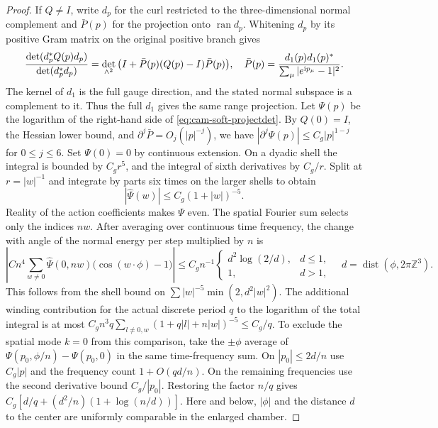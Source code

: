 \documentclass[11pt,a4paper]{article}
\numberwithin{equation}{section}
\begin{document}
\begin{proof}
If \(Q\ne I\), write \(d_p\) for the curl restricted to the three-dimensional normal complement and \(\bar P(p)\) for the projection onto \(\operatorname{ran}d_p\). Whitening \(d_p\) by its positive Gram matrix on the original positive branch gives
\begin{equation}
 \frac{\det(d_p^*Q(p)d_p)}{\det(d_p^*d_p)}
 =\det_{\wedge^2}\big(I+\bar P(p)(Q(p)-I)\bar P(p)\big),
 \quad
 \bar P(p)=\frac{d_1(p)d_1(p)^*}{\sum_\mu|e^{{\rm i}p_\mu}-1|^2}.
 \label{eq:cam-soft-projectdet}
\end{equation}
The kernel of \(d_1\) is the full gauge direction, and the stated normal subspace is a complement to it. Thus the full \(d_1\) gives the same range projection. Let \(\Psi(p)\) be the logarithm of the right-hand side of \eqref{eq:cam-soft-projectdet}. By \(Q(0)=I\), the Hessian lower bound, and \(\partial^j\bar P=O_j(|p|^{-j})\), we have \(|\partial^j\Psi(p)|\le C_g|p|^{1-j}\) for \(0\le j\le6\). Set \(\Psi(0)=0\) by continuous extension. On a dyadic shell the integral is bounded by \(C_g r^5\), and the integral of sixth derivatives by \(C_g/r\). Split at \(r=|w|^{-1}\) and integrate by parts six times on the larger shells to obtain
\begin{equation}
               |\widehat\Psi(w)|\le C_g(1+|w|)^{-5}.              \label{eq:cam-soft-projfourier}
\end{equation}
Reality of the action coefficients makes \(\Psi\) even. The spatial Fourier sum selects only the indices \(nw\). After averaging over continuous time frequency, the change with angle of the normal energy per step multiplied by \(n\) is
\[
 \left|C n^4\sum_{w\ne0}\widehat\Psi(0,nw)
                   \bigl(\cos(w\cdot\phi)-1\bigr)\right|
 \le C_g n^{-1}
 \begin{cases}d^2\log(2/d),&d\le1,\\1,&d>1,\end{cases}
 \quad d=\operatorname{dist}(\phi,2\pi\mathbb Z^3).
\]
This follows from the shell bound on \(\sum |w|^{-5}\min(2,d^2|w|^2)\). The additional winding contribution for the actual discrete period \(q\) to the logarithm of the total integral is at most
\(C_g n^3 q\sum_{l\ne0,w}(1+q|l|+n|w|)^{-5}\le C_g/q\).
To exclude the spatial mode \(k=0\) from this comparison, take the \(\pm\phi\) average of \(\Psi(p_0,\phi/n)-\Psi(p_0,0)\) in the same time-frequency sum. On \(|p_0|\le2d/n\) use \(C_g|p|\) and the frequency count \(1+O(qd/n)\). On the remaining frequencies use the second derivative bound \(C_g/|p_0|\). Restoring the factor \(n/q\) gives \(C_g[d/q+(d^2/n)(1+\log(n/d))]\). Here and below, \(|\phi|\) and the distance \(d\) to the center are uniformly comparable in the enlarged chamber.


\end{proof}
\end{document}
